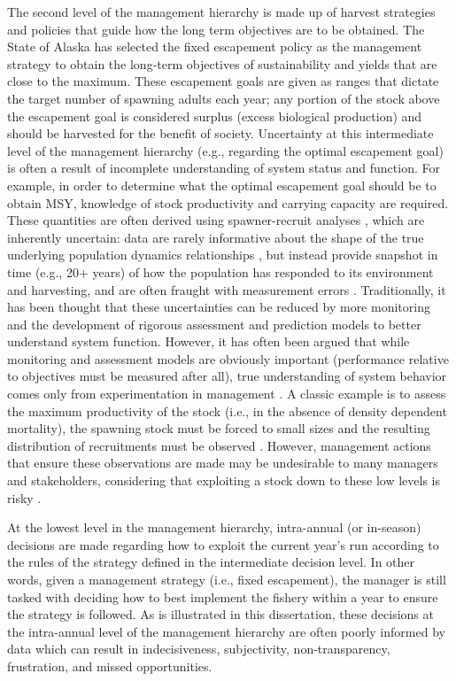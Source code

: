 \documentclass[12pt,]{book}
\theoremstyle{definition}
\theoremstyle{definition}
\theoremstyle{definition}
\theoremstyle{remark}
\begin{document}
The second level of the management hierarchy is made up of harvest
strategies and policies that guide how the long term objectives are to
be obtained. The State of Alaska has selected the fixed escapement
policy as the management strategy to obtain the long-term objectives of
sustainability and yields that are close to the maximum. These
escapement goals are given as ranges that dictate the target number of
spawning adults each year; any portion of the stock above the escapement
goal is considered surplus (excess biological production) and should be
harvested for the benefit of society. Uncertainty at this intermediate
level of the management hierarchy (e.g., regarding the optimal
escapement goal) is often a result of incomplete understanding of system
status and function. For example, in order to determine what the optimal
escapement goal should be to obtain MSY, knowledge of stock productivity
and carrying capacity are required. These quantities are often derived
using spawner-recruit analyses \citep[see][Ch.7 for an
overview]{walters-martell-2004}, which are inherently uncertain: data
are rarely informative about the shape of the true underlying population
dynamics relationships \citep{walters-hilborn-1976}, but instead provide
snapshot in time (e.g., 20+ years) of how the population has responded
to its environment and harvesting, and are often fraught with
measurement errors \citep{ludwig-walters-1981}. Traditionally, it has
been thought that these uncertainties can be reduced by more monitoring
and the development of rigorous assessment and prediction models to
better understand system function. However, it has often been argued
that while monitoring and assessment models are obviously important
(performance relative to objectives must be measured after all), true
understanding of system behavior comes only from experimentation in
management \citep[the concept of ``active adaptive
management'';][]{walters-1986}. A classic example is to assess the
maximum productivity of the stock (i.e., in the absence of density
dependent mortality), the spawning stock must be forced to small sizes
and the resulting distribution of recruitments must be observed
\citep{walters-hilborn-1976}. However, management actions that ensure
these observations are made may be undesirable to many managers and
stakeholders, considering that exploiting a stock down to these low
levels is risky \citep{walters-1986}.

At the lowest level in the management hierarchy, intra-annual (or
in-season) decisions are made regarding how to exploit the current
year's run according to the rules of the strategy defined in the
intermediate decision level. In other words, given a management strategy
(i.e., fixed escapement), the manager is still tasked with deciding how
to best implement the fishery within a year to ensure the strategy is
followed. As is illustrated in this dissertation, these decisions at the
intra-annual level of the management hierarchy are often poorly informed
by data which can result in indecisiveness, subjectivity,
non-transparency, frustration, and missed opportunities.
\end{document}
